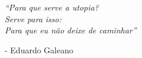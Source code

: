 \documentclass[../../monografia.tex]{subfiles}
\begin{document}
\clearpage

\vspace*{\fill}
\begin{flushright}
    \textit{``Para que serve a utopia? \\
    Serve para isso: \\
    Para que eu não deixe de caminhar''}

    \begin{flushright}
        - Eduardo Galeano
    \end{flushright}

\end{flushright}
\end{document}
